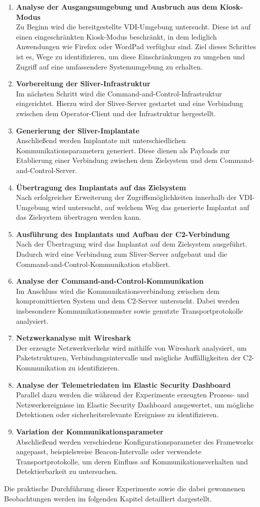 \begin{enumerate}
\item \textbf{Analyse der Ausgangsumgebung und Ausbruch aus dem Kiosk-Modus} \\
Zu Beginn wird die bereitgestellte VDI-Umgebung untersucht. 
Diese ist auf einen eingeschränkten Kiosk-Modus beschränkt, in dem lediglich Anwendungen wie Firefox oder WordPad verfügbar sind. 
Ziel dieses Schrittes ist es, Wege zu identifizieren, um diese Einschränkungen zu umgehen und Zugriff auf eine umfassendere Systemumgebung zu erhalten.
\item \textbf{Vorbereitung der Sliver-Infrastruktur} \\
Im nächsten Schritt wird die Command-and-Control-Infrastruktur eingerichtet. 
Hierzu wird der Sliver-Server gestartet und eine Verbindung zwischen dem Operator-Client und der Infrastruktur hergestellt.
\item \textbf{Generierung der Sliver-Implantate} \\
Anschließend werden Implantate mit unterschiedlichen Kommunikationsparametern generiert. 
Diese dienen als Payloads zur Etablierung einer Verbindung zwischen dem Zielsystem und dem Command-and-Control-Server.
\item \textbf{Übertragung des Implantats auf das Zielsystem} \\
Nach erfolgreicher Erweiterung der Zugriffsmöglichkeiten innerhalb der VDI-Umgebung wird untersucht, auf welchem Weg das generierte Implantat auf das Zielsystem übertragen werden kann.
\item \textbf{Ausführung des Implantats und Aufbau der C2-Verbindung} \\
Nach der Übertragung wird das Implantat auf dem Zielsystem ausgeführt. 
Dadurch wird eine Verbindung zum Sliver-Server aufgebaut und die Command-and-Control-Kommunikation etabliert.
\item \textbf{Analyse der Command-and-Control-Kommunikation} \\
Im Anschluss wird die Kommunikationsverbindung zwischen dem kompromittierten System und dem C2-Server untersucht. 
Dabei werden insbesondere Kommunikationsmuster sowie genutzte Transportprotokolle analysiert.
\item \textbf{Netzwerkanalyse mit Wireshark} \\
Der erzeugte Netzwerkverkehr wird mithilfe von Wireshark analysiert, um Paketstrukturen, Verbindungsintervalle und mögliche Auffälligkeiten der C2-Kommunikation zu identifizieren.
\item \textbf{Analyse der Telemetriedaten im Elastic Security Dashboard} \\
Parallel dazu werden die während der Experimente erzeugten Prozess- und Netzwerkereignisse im Elastic Security Dashboard ausgewertet, um mögliche Detektionen oder sicherheitsrelevante Ereignisse zu identifizieren.
\item \textbf{Variation der Kommunikationsparameter} \\
Abschließend werden verschiedene Konfigurationsparameter des Frameworks angepasst, beispielsweise Beacon-Intervalle oder verwendete Transportprotokolle, um deren Einfluss auf Kommunikationsverhalten und Detektierbarkeit zu untersuchen.
\end{enumerate}
Die praktische Durchführung dieser Experimente sowie die dabei gewonnenen Beobachtungen werden im folgenden Kapitel detailliert dargestellt.